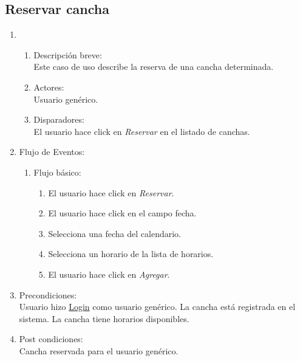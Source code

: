 \documentclass[a4paper,11pt]{article}
\begin{document}
\subsection{Reservar cancha}
\begin{enumerate}

    \item
    \begin{enumerate}
    \item Descripci\'on breve: \\
        Este caso de uso describe la reserva de una cancha determinada.
    \item Actores: \\
        Usuario gen\'erico.
    \item Disparadores: \\
        El usuario hace click en \emph{Reservar} en el listado de canchas.
    \end{enumerate}

    \item Flujo de Eventos:

    \begin{enumerate}

        \item Flujo b\'asico:
		\begin{enumerate}
		\item	El usuario hace click en \emph{Reservar}.
		\item	El usuario hace click en el campo fecha.
		\item	Selecciona una fecha del calendario.
		\item	Selecciona un horario de la lista de horarios.
		\item	El usuario hace click en \emph{Agregar}.
    		\end{enumerate}
    \end{enumerate}

    \item Precondiciones: \\
        Usuario hizo \underline{Login} como usuario gen\'erico.
        La cancha est\'a registrada en el sistema.
	La cancha tiene horarios disponibles.

    \item Post condiciones: \\
        Cancha reservada para el usuario gen\'erico.

\end{enumerate}

\end{document}
